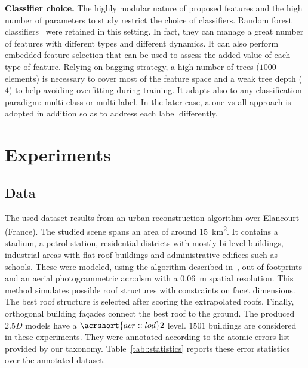 \documentclass[runningheads]{llncs}
\begin{document}
\noindent
\textbf{Classifier choice.} The highly modular nature of proposed features and the high number of parameters to study restrict the choice of classifiers. Random forest classifiers~\cite{breiman2001random} were retained in this setting. In fact, they can manage a great number of features with different types and different dynamics. It can also perform embedded feature selection that can be used to assess the added value of each type of feature. Relying on bagging strategy, a high number of trees ($1000$ elements) is necessary to cover most of the feature space and a weak tree depth ($4$) to help avoiding overfitting during training. It adapts also to any classification paradigm: multi-class or multi-label. In the later case, a one-vs-all approach is adopted in addition so as to address each label differently.
\section{Experiments}
\subsection{Data}

The used dataset results from an urban reconstruction algorithm over Elancourt (France). The studied scene spans an area of around \SI{15}{\km\squared}. It contains a stadium, a petrol station, residential districts with mostly bi-level buildings, industrial areas with flat roof buildings and administrative edifices such as schools. These were modeled, using the algorithm described in~\cite{Durupt2006}, out of footprints and an aerial photogrammetric \acrshort{acr::dsm} with a \SI{0.06}{\m} spatial resolution. This method simulates possible roof structures with constraints on facet dimensions. The best roof structure is selected after scoring the extrapolated roofs. Finally, orthogonal building fa\c{c}ades connect the best roof to the ground. The produced $2.5D$ models have a $\acrshort{acr::lod}2$ level.  $1501$ buildings are considered in these experiments. They were annotated according to the atomic errors list provided by our taxonomy. Table~\ref{tab::statistics} reports these error statistics over the annotated dataset.
\end{document}
